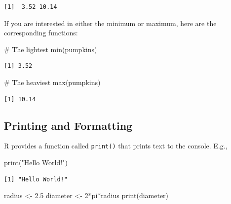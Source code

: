 \documentclass[
  letterpaper,
  DIV=11,
  numbers=noendperiod]{scrreprt}
\newenvironment{Shaded}{\begin{snugshade}}{\end{snugshade}}
\newcommand{\CommentTok}[1]{\textcolor[rgb]{0.37,0.37,0.37}{#1}}
\newcommand{\DecValTok}[1]{\textcolor[rgb]{0.68,0.00,0.00}{#1}}
\newcommand{\FloatTok}[1]{\textcolor[rgb]{0.68,0.00,0.00}{#1}}
\newcommand{\FunctionTok}[1]{\textcolor[rgb]{0.28,0.35,0.67}{#1}}
\newcommand{\NormalTok}[1]{\textcolor[rgb]{0.00,0.23,0.31}{#1}}
\newcommand{\OtherTok}[1]{\textcolor[rgb]{0.00,0.23,0.31}{#1}}
\newcommand{\SpecialCharTok}[1]{\textcolor[rgb]{0.37,0.37,0.37}{#1}}
\newcommand{\StringTok}[1]{\textcolor[rgb]{0.13,0.47,0.30}{#1}}
\begin{document}
\begin{verbatim}
[1]  3.52 10.14
\end{verbatim}

If you are interested in either the minimum or maximum, here are the
corresponding functions:

\begin{Shaded}
\begin{Highlighting}[]
\CommentTok{\# The lightest}
\FunctionTok{min}\NormalTok{(pumpkins)}
\end{Highlighting}
\end{Shaded}

\begin{verbatim}
[1] 3.52
\end{verbatim}

\begin{Shaded}
\begin{Highlighting}[]
\CommentTok{\# The heaviest}
\FunctionTok{max}\NormalTok{(pumpkins)}
\end{Highlighting}
\end{Shaded}

\begin{verbatim}
[1] 10.14
\end{verbatim}

\subsection{Printing and Formatting}\label{printing-and-formatting}

R provides a function called \texttt{print()} that prints text to the
console. E.g.,

\begin{Shaded}
\begin{Highlighting}[]
\FunctionTok{print}\NormalTok{(}\StringTok{"Hello World!"}\NormalTok{)}
\end{Highlighting}
\end{Shaded}

\begin{verbatim}
[1] "Hello World!"
\end{verbatim}

\begin{Shaded}
\begin{Highlighting}[]
\NormalTok{radius }\OtherTok{\textless{}{-}} \FloatTok{2.5}
\NormalTok{diameter }\OtherTok{\textless{}{-}} \DecValTok{2}\SpecialCharTok{*}\NormalTok{pi}\SpecialCharTok{*}\NormalTok{radius}
\FunctionTok{print}\NormalTok{(diameter)}
\end{Highlighting}
\end{Shaded}
\end{document}
